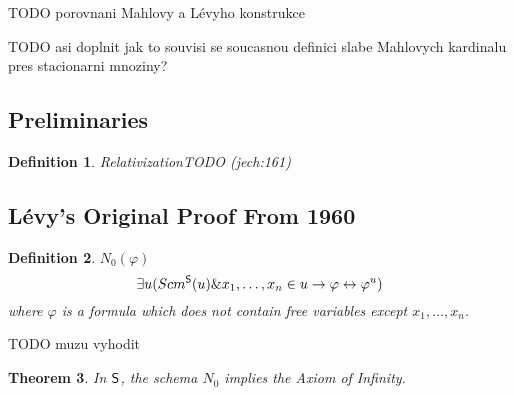 \documentclass[12pt,a4paper]{article}
\newtheorem{theorem}{Theorem}[section]
\newtheorem{definition}[theorem]{Definition}
\renewcommand{\iff}{\leftrightarrow}
\newcommand{\then}{\rightarrow}
\begin{document}
TODO porovnani Mahlovy a Lévyho konstrukce

TODO asi doplnit jak to souvisi se soucasnou definici slabe Mahlovych kardinalu pres stacionarni mnoziny?

\subsection{Preliminaries}
\begin{definition}{Relativization}\label{def:relativization}
TODO (jech:161)
\end{definition}


\subsection{Lévy's Original Proof From 1960}\label{sec:Levy1960}
\begin{definition}{$N_0(\varphi)$}
\begin{equation}
\exists u (Scm^{\sf{S}}(u) \& x_1, \ldots , x_n \in u \then \varphi \iff \varphi^{u})
\end{equation}
where $\varphi$ is a formula which does not contain free variables except $x_1, \ldots , x_n$.
\end{definition}

TODO muzu vyhodit 

\begin{theorem}
In $\sf{S}$, the schema $N_0$ implies the Axiom of Infinity.
\end{theorem}
\end{document}
